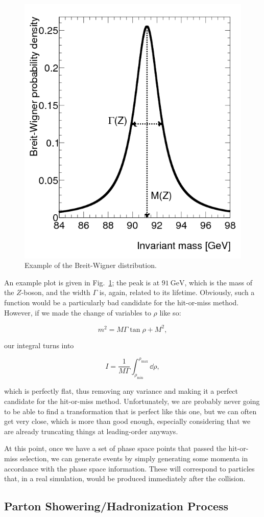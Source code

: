 \begin{figure}[ht]
  \centering
  \includegraphics[width=0.4\linewidth]{./res/gfx/breit-wigner.png}
  \caption{Example of the Breit-Wigner distribution.}
  \label{fig:BreitWigner}
\end{figure}


An example plot is given in Fig.~\ref{fig:BreitWigner}; the peak is at $\qty{91}{\GeV}$, which is the mass of the $Z$-boson, and the width $\Gamma$ is, again, related to its lifetime. Obviously, such a function would be a particularly bad candidate for the hit-or-miss method. However, if we made the change of variables to $\rho$ like so:

\begin{equation}
  m^2 = M\Gamma\tan\rho + M^2,
\end{equation}

our integral turns into

\begin{equation}
  I = \frac{1}{M\Gamma} \int_{\rho_{\mathrm{min}}}^{\rho_{\mathrm{max}}} \dd\rho,
\end{equation}

which is perfectly flat, thus removing any variance and making it a perfect candidate for the hit-or-miss method. Unfortunately, we are probably never going to be able to find a transformation that is perfect like this one, but we can often get very close, which is more than good enough, especially considering that we are already truncating things at leading-order anyways.

At this point, once we have a set of phase space points that passed the hit-or-miss selection, we can generate events by simply generating some momenta in accordance with the phase space information. These will correspond to particles that, in a real simulation, would be produced immediately after the collision.


\subsection{Parton Showering/Hadronization Process}

